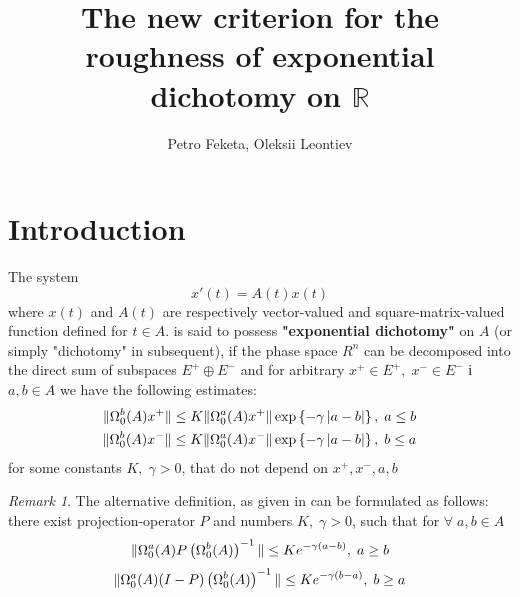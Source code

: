 \documentclass[12pt]{article} %
\title{The new criterion for the roughness of exponential dichotomy on $\mathbb{R}$}
\author{Petro Feketa, Oleksii Leontiev}
\let\oldforall\forall
\renewcommand{\forall}{\oldforall\;}
\theoremstyle{remark}
\newtheorem{remark}{Remark}
\begin{document}
\maketitle
\section{Introduction}
The system 
\[x'(t)=A(t)x(t)\]
where $x(t)$ and $A(t)$ are respectively vector-valued and square-matrix-valued function defined for $t\in A$.
is said to possess \textbf{"exponential dichotomy"} on $A$ (or simply "dichotomy" in subsequent), if the phase space $R^n$
can be decomposed into the direct sum of subspaces
$E^+\oplus E^-$ and for arbitrary $x^+\in E^+,\; x^-\in E^-$ і $a,b\in A$ we have the following estimates:
\begin{equation}\begin{aligned}\label{DichotomyDef}
	\|\Omega^b_0(A)x^+\|\leq K\|\Omega_0^a(A)x^+\|\exp\left\{-\gamma\left|a-b\right|\right\},\;a\leq b\\
	\|\Omega^b_0(A)x^-\|\leq K\|\Omega_0^a(A)x^-\|\exp\left\{-\gamma\left|a-b\right|\right\},\;b\leq a\\
\end{aligned}\end{equation}
for some constants $K,\;\gamma>0$, that do not depend on $x^+,x^-,a,b$

\begin{remark}The alternative definition, as given in \cite{coppel} can be formulated as follows: there exist projection-operator $P$ and numbers
$K,\;\gamma>0$, such that
 for $\forall a,b\in A$
\[\|\Omega_0^a(A)P\left(\Omega_0^b(A)\right)^{-1}\|\leq K e^{-\gamma(a-b)},\;a\geq b\]
\[\|\Omega_0^a(A)(I-P)\left(\Omega_0^b(A)\right)^{-1}\|\leq K e^{-\gamma(b-a)},\;b\geq a\]
\end{remark}
\end{document}
